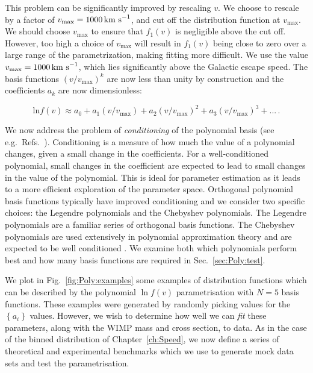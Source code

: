 This problem can be significantly improved by rescaling $v$. We choose to rescale by a factor of $v_\textrm{max} = 1000 \,\textrm{km s}^{-1}$, and cut off the distribution function at $v_\textrm{max}$. We should choose $v_\textrm{max}$ to ensure that $f_1(v)$ is negligible above the cut off. However, too high a choice of $v_\textrm{max}$ will result in $f_1(v)$ being close to zero over a large range of the parametrization, making fitting more difficult. We use the value $v_\textrm{max} = 1000 \,\textrm{km s}^{-1}$, which lies significantly above the Galactic escape speed. The basis functions $(v/v_\textrm{max})^k$ are now less than unity by construction and the coefficients $a_k$ are now dimensionless:

\begin{equation}
\textrm{ln}f(v) \approx a_0 + a_1 (v/v_\textrm{max}) + a_2 (v/v_\textrm{max})^2 + a_3 (v/v_\textrm{max})^3 + ...\,.
\end{equation}

We now address the problem of \textit{conditioning} of the polynomial basis (see e.g.\ Refs.~\cite{Gautschi:1978, Wilkinson:1984}). Conditioning is a measure of how much the value of a polynomial changes, given a small change in the coefficients. For a well-conditioned polynomial, small changes in the coefficient are expected to lead to small changes in the value of the polynomial. This is ideal for parameter estimation as it leads to a more efficient exploration of the parameter space. Orthogonal polynomial basis functions typically have improved conditioning \cite{Gautschi:1978} and we consider two specific choices: the Legendre polynomials and the Chebyshev polynomials. The Legendre polynomials are a familiar series of orthogonal basis functions. The Chebyshev polynomials are used extensively in polynomial approximation theory \cite{Mason:2002} and are expected to be well conditioned \cite{Gautschi:1978}. We examine both which polynomials perform best and how many basis functions are required in Sec.~\ref{sec:Poly:test}.

We plot in Fig.~\ref{fig:Poly:examples} some examples of distribution functions which can be described by the polynomial $\ln f(v)$ parametrisation with $N=5$ basis functions. These examples were generated by randomly picking values for the $\left\{a_i\right\}$ values. However, we wish to determine how well we can \textit{fit} these parameters, along with the WIMP mass and cross section, to data. As in the case of the binned distribution of Chapter~\ref{ch:Speed}, we now define a series of theoretical and experimental benchmarks which we use to generate mock data sets and test the parametrisation. 

